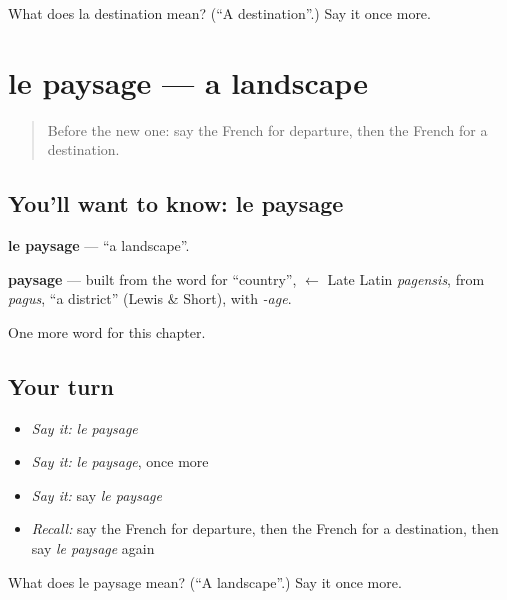 \begin{tcolorbox}[breakable,colback=teal!4,colframe=teal!35!black,title={Before you move on}]
What does la destination mean? (\textquotedblleft{}A destination\textquotedblright{}.) Say it once more.
\end{tcolorbox}
\section[le paysage]{le paysage — a landscape}

\label{lesson:FR-C231-paysage}



\begin{quote}
Before the new one: say the French for departure, then the French for a destination.
\end{quote}

\subsection*{You'll want to know: le paysage}
\textbf{le paysage} — \textquotedblleft{}a landscape\textquotedblright{}.

\begin{cousinweb}
\textbf{paysage} — built from the word for \textquotedblleft{}country\textquotedblright{}, $\leftarrow$ Late Latin \emph{pagensis}, from \emph{pagus}, \textquotedblleft{}a district\textquotedblright{} (Lewis \& Short), with \emph{-age}.
\end{cousinweb}

\begin{grammarlens}[title={What you've built}]
One more word for this chapter.
\end{grammarlens}

\subsection*{Your turn}
\begin{itemize}
\raggedright
  \item \emph{Say it:} \emph{le paysage}
  \item \emph{Say it:} \emph{le paysage}, once more
  \item \emph{Say it:} say \emph{le paysage}
  \item \emph{Recall:} say the French for departure, then the French for a destination, then say \emph{le paysage} again
\end{itemize}

\begin{tcolorbox}[breakable,colback=teal!4,colframe=teal!35!black,title={Before you move on}]
What does le paysage mean? (\textquotedblleft{}A landscape\textquotedblright{}.) Say it once more.
\end{tcolorbox}
